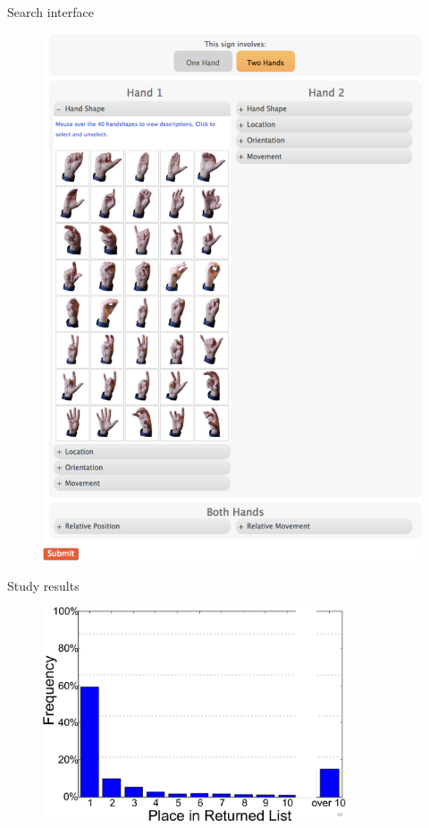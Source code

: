	\begin{frame}{Search interface}
		\begin{figure}
			\centering
			\includegraphics[height=0.9\textheight]{images/ASL-searchUI}
		\end{figure}
	\end{frame}

	\begin{frame}{Study results}
		\begin{figure}
			\centering
			\includegraphics[width=0.8\textwidth]{images/ASL-results-placement}
		\end{figure}
	\end{frame}

